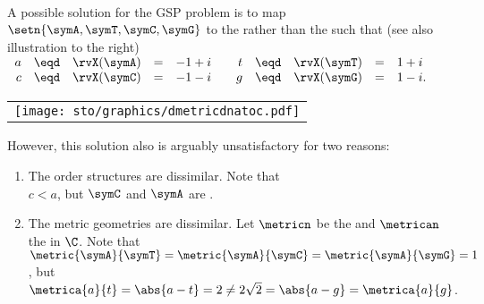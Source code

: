 \begin{tabstr}{0.75}
\begin{example}
\label{ex:gsp_C}
\mbox{}\\\begin{minipage}{\tw-46mm}%
A possible solution for the GSP problem  is to map $\setn{\symA, \symT, \symC, \symG}$
to the   
rather than the   such that (see also illustration to the right)
\\\indentx$\begin{array}{rcrcl@{\qquad}rcrcl}
  a&\eqd&\rvX(\symA) &=& -1+i  & t&\eqd&\rvX(\symT) &=& 1+i\\
  c&\eqd&\rvX(\symC) &=& -1-i  & g&\eqd&\rvX(\symG) &=& 1-i .
\end{array}$
\end{minipage}%
\hfill%
{\begin{tabular}{c}%
  \gsize%
  \psset{unit=5mm}%
  {\texttt{[image: sto/graphics/dmetricdnatoc.pdf]}}%
\end{tabular}}
However, this solution also is arguably unsatisfactory for two reasons:
\begin{enumerate}
  \item The order structures are dissimilar. Note that 
        \\\indentx$c<a$, but $\symC$ and $\symA$ are  .
  \item The metric geometries are dissimilar. 
        Let $\metricn$ be the  and $\metrican$ the  in $\C$.
        Note that 
        \\\indentx$\metric{\symA}{\symT} = \metric{\symA}{\symC} = \metric{\symA}{\symG} = 1$, but
        \\\indentx$\metrica{a}{t}=\abs{a-t}=2 \neq 2\sqrt{2}=\abs{a-g}=\metrica{a}{g}$.
\end{enumerate}
\end{example}




\end{tabstr}
